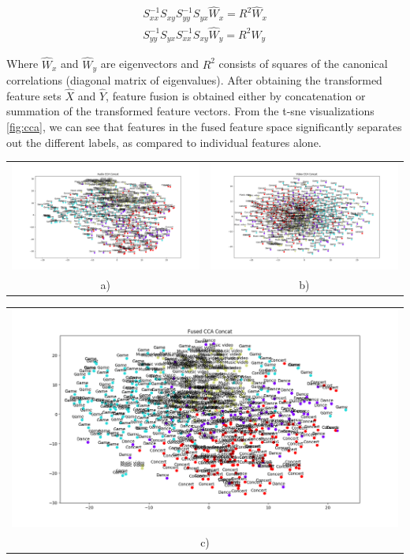 \documentclass{article}
\begin{document}
\begin{gather*}
S_{xx}^{-1}S_{xy}S_{yy}^{-1}S_{yx}\hat{W}_x = R^2\hat{W}_x \\ 	S_{yy}^{-1}S_{yx}S_{xx}^{-1}S_{xy}\hat{W}_y = R^2\hat{W}_y
\end{gather*}

Where $\hat{W}_x$ and $\hat{W}_y$ are eigenvectors and $R^2$ consists of squares of the canonical correlations (diagonal matrix of eigenvalues). After obtaining the transformed feature sets $\hat{X}$ and $\hat{Y}$, feature fusion is obtained either by concatenation or summation of the transformed feature vectors. From the t-sne visualizations \ref{fig:cca}, we can see that features in the fused feature space significantly separates out the different labels, as compared to individual features alone. 
\begin{center}
\begin{tabular}{cc}
\includegraphics[width=0.49\linewidth]{figures/c_c_a.png} &
\includegraphics[width=0.49\linewidth]{figures/c_c_v.png} \\
 a) & b)\\
 \end{tabular}
 \begin{tabular}{c}
\includegraphics[width=0.49\linewidth]{figures/c_c_f.png} \\
 c)\\
 \end{tabular}
 \label{fig:cca}
 \end{center}
\end{document}

